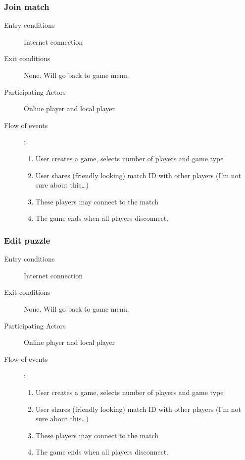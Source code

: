 \documentclass[12pt]{article}
\begin{document}
    \subsubsection{Join match}
    \begin{description}
        \item[Entry conditions] Internet connection
        \item[Exit conditions] None. Will go back to game menu.
        \item[Participating Actors] Online player and local player
        \item[Flow of events]:
            \begin{enumerate}
                \item User creates a game, selects number of players and game
                    type
                \item User shares (friendly looking) match ID with other
                    players (I’m not sure about this…)
                \item These players may connect to the match
                \item The game ends when all players disconnect.
            \end{enumerate}
    \end{description}


    \subsubsection{Edit puzzle}
    \begin{description}
        \item[Entry conditions] Internet connection
        \item[Exit conditions] None. Will go back to game menu.
        \item[Participating Actors] Online player and local player
        \item[Flow of events]:
            \begin{enumerate}
                \item User creates a game, selects number of players and game
                    type
                \item User shares (friendly looking) match ID with other
                    players (I’m not sure about this…)
                \item These players may connect to the match
                \item The game ends when all players disconnect.
            \end{enumerate}
    \end{description}
\end{document}
